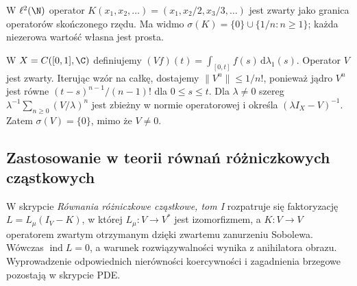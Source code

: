 \begin{przyklad}
\label{ex:diagonal-spectrum30}
W $\ell^2(\N)$ operator
$K(x_1,x_2,\ldots)=(x_1,x_2/2,x_3/3,\ldots)$
jest zwarty jako granica operatorów skończonego rzędu.
Ma widmo $\sigma(K)=\{0\}\cup\{1/n:n\ge1\}$;
każda niezerowa wartość własna jest prosta.
\end{przyklad}

\begin{przyklad}
\label{ex:volterra-spectrum30}
W $X=C([0,1],\C)$ definiujemy
$(Vf)(t)=\int_{[0,t]}f(s)\,\mathrm d\lambda_1(s)$.
Operator $V$ jest zwarty. Iterując wzór na całkę,
dostajemy $\|V^n\|\le 1/n!$, ponieważ jądro $V^n$
jest równe $(t-s)^{n-1}/(n-1)!$ dla $0\le s\le t$.
Dla $\lambda\ne0$ szereg
$\lambda^{-1}\sum_{n\ge0}(V/\lambda)^n$
jest zbieżny w normie operatorowej i określa
$(\lambda I_X-V)^{-1}$. Zatem $\sigma(V)=\{0\}$,
mimo że $V\ne0$.
\end{przyklad}

\subsection{Zastosowanie w teorii równań różniczkowych cząstkowych}

\begin{uwaga}
\label{rem:elliptic-fredholm30}
W skrypcie \emph{Równania różniczkowe cząstkowe, tom I}
rozpatruje się faktoryzację $L=L_\mu(I_V-K)$,
w której $L_\mu:V\to V^*$ jest izomorfizmem,
a $K:V\to V$ operatorem zwartym otrzymanym dzięki
zwartemu zanurzeniu Sobolewa. Wówczas $\operatorname{ind}L=0$,
a warunek rozwiązywalności wynika z anihilatora obrazu.
Wyprowadzenie odpowiednich nierówności koercywności
i zagadnienia brzegowe pozostają w skrypcie PDE.
\end{uwaga}
